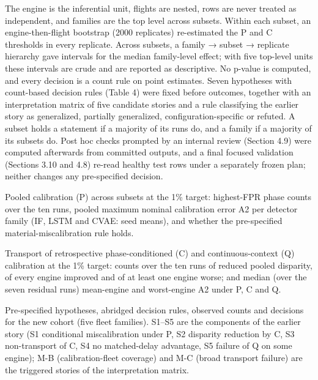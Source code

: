 \documentclass[preprint,11pt,a4paper]{elsarticle}
\begin{document}
The engine is the inferential unit, flights are nested, rows are never treated as independent, and families are the top level across subsets. Within each subset, an engine-then-flight bootstrap (2000 replicates) re-estimated the P and C thresholds in every replicate. Across subsets, a family → subset → replicate hierarchy gave intervals for the median family-level effect; with five top-level units these intervals are crude and are reported as descriptive. No p-value is computed, and every decision is a count rule on point estimates. Seven hypotheses with count-based decision rules (Table 4) were fixed before outcomes, together with an interpretation matrix of five candidate stories and a rule classifying the earlier story as generalized, partially generalized, configuration-specific or refuted. A subset holds a statement if a majority of its runs do, and a family if a majority of its subsets do. Post hoc checks prompted by an internal review (Section 4.9) were computed afterwards from committed outputs, and a final focused validation (Sections 3.10 and 4.8) re-read healthy test rows under a separately frozen plan; neither changes any pre-specified decision.
\begin{table}[htbp]
\centering
\small
\caption{Pooled calibration (P) across subsets at the 1\% target: highest-FPR phase counts over the ten runs, pooled maximum nominal calibration error A2 per detector family (IF, LSTM and CVAE: seed means), and whether the pre-specified material-miscalibration rule holds.}
\label{tab:2}
\begin{adjustbox}{max width=\textwidth}

\end{adjustbox}
\end{table}
\begin{table}[htbp]
\centering
\small
\caption{Transport of retrospective phase-conditioned (C) and continuous-context (Q) calibration at the 1\% target: counts over the ten runs of reduced pooled disparity, of every engine improved and of at least one engine worse; and median (over the seven residual runs) mean-engine and worst-engine A2 under P, C and Q.}
\label{tab:3}
\begin{adjustbox}{max width=\textwidth}

\end{adjustbox}
\end{table}
\begin{table}[htbp]
\centering
\small
\caption{Pre-specified hypotheses, abridged decision rules, observed counts and decisions for the new cohort (five fleet families). S1–S5 are the components of the earlier story (S1 conditional miscalibration under P, S2 disparity reduction by C, S3 non-transport of C, S4 no matched-delay advantage, S5 failure of Q on some engine); M-B (calibration-fleet coverage) and M-C (broad transport failure) are the triggered stories of the interpretation matrix.}
\label{tab:4}
\begin{adjustbox}{max width=\textwidth}

\end{adjustbox}
\end{table}
\end{document}
